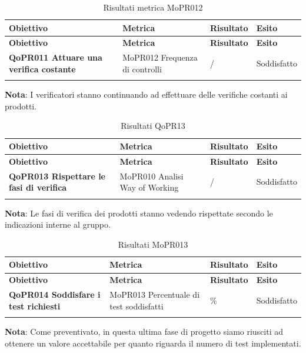 \renewcommand{\arraystretch}{2} %
\begin{longtable}[H]{>{\centering\bfseries}m{5cm} >{\centering}m{5cm} >{\centering}m{2.5cm} >{\centering\arraybackslash}m{2.5cm}}  
  \rowcolor{lightgray}
  {\textbf{Obiettivo}} & {\textbf{Metrica}} & {\textbf{Risultato}} & {\textbf{Esito}}  \\
  \endfirsthead%
  \rowcolor{lightgray}
  {\textbf{Obiettivo}} & {\textbf{Metrica}} & {\textbf{Risultato}} & {\textbf{Esito}}  \\
  \endhead%
  \textbf{QoPR011 Attuare una verifica costante} & MoPR012 Frequenza di controlli & / & Soddisfatto \\
  \caption{Risultati metrica MoPR012}
  \label{tab:my-table}
\end{longtable}
\textbf{Nota}: I verificatori stanno continuando ad effettuare delle verifiche costanti ai prodotti.


\renewcommand{\arraystretch}{2} %
\begin{longtable}[H]{>{\centering\bfseries}m{5cm} >{\centering}m{5cm} >{\centering}m{2.5cm} >{\centering\arraybackslash}m{2.5cm}}  
  \rowcolor{lightgray}
  {\textbf{Obiettivo}} & {\textbf{Metrica}} & {\textbf{Risultato}} & {\textbf{Esito}}  \\
  \endfirsthead%
  \rowcolor{lightgray}
  {\textbf{Obiettivo}} & {\textbf{Metrica}} & {\textbf{Risultato}} & {\textbf{Esito}}  \\
  \endhead%
  \textbf{QoPR013 Rispettare le fasi di verifica} & MoPR010 Analisi Way of Working & / & Soddisfatto \\
  \caption{Risultati QoPR13}
  \label{tab:my-table}
\end{longtable}
\textbf{Nota}: Le fasi di verifica dei prodotti stanno vedendo rispettate secondo le indicazioni interne al gruppo.

\renewcommand{\arraystretch}{2} %
\begin{longtable}[H]{>{\centering\bfseries}m{5cm} >{\centering}m{5cm} >{\centering}m{2.5cm} >{\centering\arraybackslash}m{2.5cm}}  
  \rowcolor{lightgray}
  {\textbf{Obiettivo}} & {\textbf{Metrica}} & {\textbf{Risultato}} & {\textbf{Esito}}  \\
  \endfirsthead%
  \rowcolor{lightgray}
  {\textbf{Obiettivo}} & {\textbf{Metrica}} & {\textbf{Risultato}} & {\textbf{Esito}}  \\
  \endhead%
  \textbf{QoPR014 Soddisfare i test richiesti} & MoPR013 Percentuale di test soddisfatti & 88.35\% & Soddisfatto \\
  \caption{Risultati MoPR013}
  \label{tab:my-table}
\end{longtable}
\textbf{Nota}: Come preventivato, in questa ultima fase di progetto siamo riusciti ad ottenere un valore accettabile per quanto riguarda il numero di test implementati.

